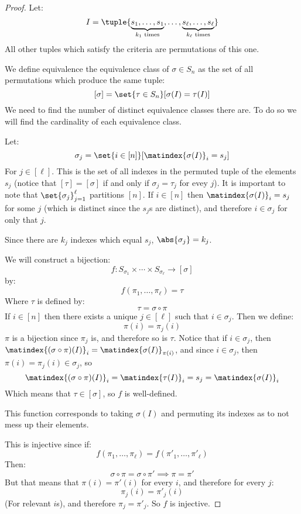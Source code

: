 \begin{proof}

	Let:
	\[ I = \tuple{\underbrace{s_1,\dots,s_1}_{k_1 \text{ times}},\dots,\underbrace{s_\ell,\dots,s_\ell}_{k_\ell \text{ times}}} \]
	All other tuples which satisfy the criteria are permutations of this one.

	We define equivalence the equivalence class of $\sigma\in S_n$ as the set of all permutations which produce the same
	tuple:
	\[ [\sigma] = \set{\tau\in S_n}[\sigma(I) = \tau(I)] \]
	We need to find the number of distinct equivalence classes there are. To do so we will find the cardinality of each
	equivalence class.

	Let:
	\[ \sigma_j = \set{i\in[n]}[\matindex{\sigma(I)}_i=s_j] \]
	For $j\in[\ell]$. This is the set of all indexes in the permuted tuple of the elements $s_j$
	(notice that $[\tau]=[\sigma]$ if and only if $\sigma_j=\tau_j$ for evey $j$).
	It is important to note that $\set{\sigma_j}_{j=1}^\ell$ partitions $[n]$. If $i\in[n]$ then $\matindex{\sigma(I)}_i=s_j$
	for some $j$ (which is distinct since the $s_j$s are distinct), and therefore $i\in\sigma_j$ for only that $j$.

	Since there are $k_j$ indexes which equal $s_j$, $\abs{\sigma_j}=k_j$. 

	We will construct a bijection:
	\[ f\colon S_{\sigma_1}\times\cdots\times S_{\sigma_\ell} \longrightarrow [\sigma] \]
	by:
	\[ f(\pi_1,\dots,\pi_\ell) = \tau \]
	Where $\tau$ is defined by:
	\[ \tau=\sigma\circ\pi \]
	If $i\in[n]$ then there exists a unique $j\in[\ell]$ such that $i\in\sigma_j$. Then we define:
	\[ \pi(i) = \pi_j(i) \]
	$\pi$ is a bijection since $\pi_j$ is, and therefore so is $\tau$.
	Notice that if $i\in\sigma_j$, then $\matindex{(\sigma\circ\pi)(I)}_i=\matindex{\sigma(I)}_{\pi(i)}$, and since
	$i\in\sigma_j$, then $\pi(i)=\pi_j(i)\in\sigma_j$, so
	\[ \matindex{(\sigma\circ\pi)(I)}_i=\matindex{\tau(I)}_{i}=s_j=\matindex{\sigma(I)}_i \]
	Which means that $\tau\in[\sigma]$, so $f$ is well-defined.

	This function corresponds to taking $\sigma(I)$ and permuting its indexes as to not mess up their elements.

	This is injective since if:
	\[ f(\pi_1,\dots,\pi_\ell) = f(\pi'_1,\dots,\pi'_\ell) \]
	Then:
	\[ \sigma\circ\pi = \sigma\circ\pi' \implies \pi = \pi' \]
	But that means that $\pi(i)=\pi'(i)$ for every $i$, and therefore for every $j$:
	\[ \pi_j(i) = \pi'_j(i) \]
	(For relevant $i$s), and therefore $\pi_j=\pi'_j$. So $f$ is injective.


\end{proof}
